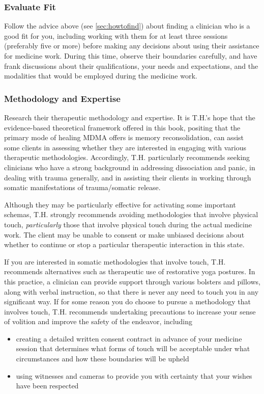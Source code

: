 \documentclass[11pt,oneside]{book}
\begin{document}
\subsubsection*{Evaluate Fit}
Follow the advice above (see \cref{sec:howtofind}) about finding a clinician who is a good fit for you, including working with them for at least three sessions (preferably five or more) before making any decisions about using their assistance for medicine work. During this time, observe their boundaries carefully, and have frank discussions about their qualifications, your needs and expectations, and the modalities that would be employed during the medicine work.

\subsubsection*{Methodology and Expertise}
Research their therapeutic methodology and expertise.  It is T.H.'s hope that the evidence-based theoretical framework offered in this book, positing that the primary mode of healing MDMA offers is memory reconsolidation, can assist some clients in assessing whether they are interested in engaging with various therapeutic methodologies. Accordingly, T.H. particularly recommends seeking clinicians who have a strong background in addressing dissociation and panic, in dealing with trauma generally, and in assisting their clients in working through somatic manifestations of trauma/somatic release.

Although they may be particularly effective for activating some important schemas, T.H. strongly recommends avoiding methodologies that involve physical touch, \textit{particularly} those that involve physical touch during the actual medicine work. The client may be unable to consent or make unbiased decisions about whether to continue or stop a particular therapeutic interaction in this state.

If you are interested in somatic methodologies that involve touch, T.H. recommends alternatives such as therapeutic use of restorative yoga postures. In this practice, a clinician can provide support through various bolsters and pillows, along with verbal instruction, so that there is never any need to touch you in any significant way. If for some reason you do choose to pursue a methodology that involves touch, T.H. recommends undertaking precautions to increase your sense of volition and improve the safety of the endeavor, including
\begin{itemize}
    \item creating a detailed written consent contract in advance of your medicine session that determines what forms of touch will be acceptable under what circumstances and how these boundaries will be upheld
    \item using witnesses and cameras to provide you with certainty that your wishes have been respected
\end{itemize}
\end{document}
